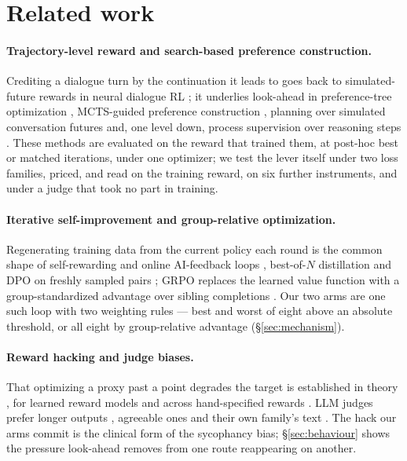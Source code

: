 \section{Related work}
\label{sec:related}

\paragraph{Trajectory-level reward and search-based preference construction.} Crediting a
dialogue turn by the continuation it leads to goes back to simulated-future rewards in neural
dialogue RL \citep{li2016deeprl}; it underlies look-ahead in preference-tree optimization
\citep{baruch2025pto}, MCTS-guided preference construction \citep{xie2024mctsdpo,yu2023promptmcts},
planning over simulated conversation futures \citep{chen2025broaden} and, one level down,
process supervision over reasoning steps \citep{lightman2024letsverify}. These methods are
evaluated on the reward that trained them, at post-hoc best or matched iterations, under one
optimizer; we test the lever itself under two loss families, priced, and read on the training
reward, on six further instruments, and under a judge that took no part in training.

\paragraph{Iterative self-improvement and group-relative optimization.} Regenerating training
data from the current policy each round is the common shape of self-rewarding and online
AI-feedback loops \citep{yuan2024selfrewarding,guo2024oaif}, best-of-$N$ distillation
\citep{pace2024westofn} and DPO on freshly sampled pairs \citep{rafailov2023dpo}; GRPO replaces
the learned value function with a group-standardized advantage over sibling completions
\citep{shao2024deepseekmath}. Our two arms are one such loop with two weighting rules --- best
and worst of eight above an absolute threshold, or all eight by group-relative advantage
(\S\ref{sec:mechanism}).

\paragraph{Reward hacking and judge biases.} That optimizing a proxy past a point degrades the
target is established in theory \citep{skalse2022defining}, for learned reward models
\citep{gao2023scaling} and across hand-specified rewards \citep{amodei2016concrete,pan2022effects}.
LLM judges prefer longer outputs \citep{singhal2024long,dubois2024lengthcontrolled,zheng2023judging},
agreeable ones \citep{sharma2024sycophancy} and their own family's text
\citep{panickssery2024selfpreference}. The hack our \Kz{} arms commit is the clinical form of the
sycophancy bias; \S\ref{sec:behaviour} shows the pressure look-ahead removes from one route
reappearing on another.

